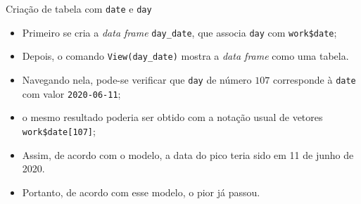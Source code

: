 \documentclass[a4paper,10pt]{beamer}
\begin{document}
\begin{frame}{ Criação de tabela com {\tt date} e {\tt day} }
  
  
  \begin{itemize}
      \item Primeiro se cria a {\em data frame} {\tt day\_date}, que 
	  associa {\tt day} com {\tt work\$date};
      \item Depois, o comando {\tt View(day\_date)} mostra a {\em data frame}
	  como  uma tabela.

      \item Navegando nela, pode-se verificar que {\tt day} de número $107$
	  corresponde à {\tt date} com valor {\tt 2020-06-11};
      \item o mesmo resultado poderia ser obtido com a notação usual de vetores
	  {\tt work\$date[107]};
      \item Assim, de acordo com o modelo, a data do pico teria sido em 11 de 
	  junho de 2020.
      \item Portanto, de acordo com esse modelo, o pior já passou.
  \end{itemize}

\end{frame}
\end{document}

